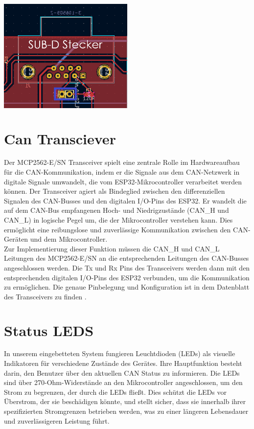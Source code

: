 \begin{centering}
\includegraphics[width=0.5\textwidth]{img/SUB_D_zuschaltbarer_widerstand.png}
\label{fig: SUB-D Stecker und Terminierungswiderstand}
\end{centering}

\section{Can Transciever}
\noindent Der MCP2562-E/SN Transceiver spielt eine zentrale Rolle im Hardwareaufbau für die CAN-Kommunikation, indem er die Signale aus dem CAN-Netzwerk in digitale Signale umwandelt, die vom ESP32-Mikrocontroller verarbeitet werden können. Der Transceiver agiert als Bindeglied zwischen den differenziellen Signalen des CAN-Busses und den digitalen I/O-Pins des ESP32. Er wandelt die auf dem CAN-Bus empfangenen Hoch- und Niedrigzustände (CAN\_H und CAN\_L) in logische Pegel um, die der Mikrocontroller verstehen kann. Dies ermöglicht eine reibungslose und zuverlässige Kommunikation zwischen den CAN-Geräten und dem Mikrocontroller.\\

\noindent Zur Implementierung dieser Funktion müssen die CAN\_H und CAN\_L Leitungen des MCP2562-E/SN an die entsprechenden Leitungen des CAN-Busses angeschlossen werden. Die Tx und Rx Pins des Transceivers werden dann mit den entsprechenden digitalen I/O-Pins des ESP32 verbunden, um die Kommunikation zu ermöglichen. Die genaue Pinbelegung und Konfiguration ist in dem Datenblatt des Transceivers zu finden \cite{2}.\\

\section{Status LEDS}
In unserem eingebetteten System fungieren Leuchtdioden (LEDs) als visuelle Indikatoren für verschiedene Zustände des Gerätes. Ihre Hauptfunktion besteht darin, den Benutzer über den aktuellen CAN Status zu informieren. Die LEDs sind über 270-Ohm-Widerstände an den Mikrocontroller angeschlossen, um den Strom zu begrenzen, der durch die LEDs fließt. Dies schützt die LEDs vor Überstrom, der sie beschädigen könnte, und stellt sicher, dass sie innerhalb ihrer spezifizierten Stromgrenzen betrieben werden, was zu einer längeren Lebensdauer und zuverlässigeren Leistung führt.\\

